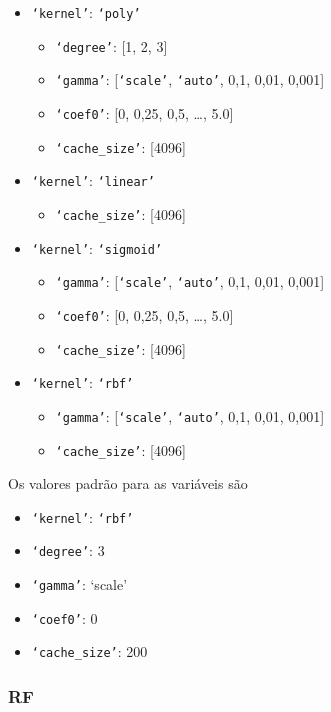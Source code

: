 \begin{itemize}
    \item \texttt{`kernel'}: \texttt{`poly'}
    \begin{itemize}
        \item \texttt{`degree'}: [1, 2, 3]
        \item \texttt{`gamma'}: [\texttt{`scale'}, \texttt{`auto'}, 0,1, 0,01, 0,001]
        \item \texttt{`coef0'}: [0, 0,25, 0,5, \dots, 5.0]
        \item \texttt{`cache\_size'}: [4096]
    \end{itemize}
    \item \texttt{`kernel'}: \texttt{`linear'}
    \begin{itemize}
        \item \texttt{`cache\_size'}: [4096]
    \end{itemize}
    \item \texttt{`kernel'}: \texttt{`sigmoid'}
    \begin{itemize}
        \item \texttt{`gamma'}: [\texttt{`scale'}, \texttt{`auto'}, 0,1, 0,01, 0,001]
        \item \texttt{`coef0'}: [0, 0,25, 0,5, \dots, 5.0]
        \item \texttt{`cache\_size'}: [4096]
    \end{itemize}
    \item \texttt{`kernel'}: \texttt{`rbf'}
    \begin{itemize}
        \item \texttt{`gamma'}: [\texttt{`scale'}, \texttt{`auto'}, 0,1, 0,01, 0,001]
        \item \texttt{`cache\_size'}: [4096]
    \end{itemize}
\end{itemize}

Os valores padrão para as variáveis são

\begin{itemize}
    \item \texttt{`kernel'}: \texttt{`rbf'}
    \item \texttt{`degree'}: 3
    \item \texttt{`gamma'}: `scale'
    \item \texttt{`coef0'}: 0
    \item \texttt{`cache\_size'}: 200
\end{itemize}


\subsubsection{RF}\label{subsubsec:rf_hps}

